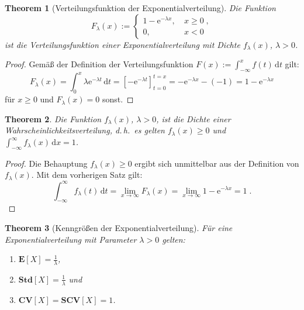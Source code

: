 \documentclass[a4paper,11pt,oneside]{article}
\newtheorem{theorem}{Theorem}
\theoremstyle{definition}
\begin{document}
\begin{theorem}[Verteilungsfunktion der Exponentialverteilung]
Die Funktion
$$
F_{\lambda}(x):=\left\{\begin{matrix}
1-\mathrm{e}^{-\lambda x},&~x\ge0\;,\\
0,&~x<0
\end{matrix}\right.
$$
ist die Verteilungsfunktion einer Exponentialverteilung mit Dichte $f_\lambda(x)$, $\lambda>0$.
\end{theorem}

\begin{proof}
Gemäß der Definition der Verteilungsfunktion $F(x):=\int_{-\infty}^x f(t)\,\mbox{d}t$ gilt:
$$
F_\lambda(x)=\int_0^x \lambda \mathrm{e}^{-\lambda t}\,\mbox{d}t=\left[-\mathrm{e}^{-\lambda t}\right]_{t=0}^{t=x}=-\mathrm{e}^{-\lambda x}-(-1)=1-\mathrm{e}^{-\lambda x}
$$
für $x\ge0$ und $F_\lambda(x)=0$ sonst.
\end{proof}

\begin{theorem}
Die Funktion $f_\lambda(x)$, $\lambda>0$, ist die Dichte einer Wahrscheinlichkeitsverteilung, d.\,h.\ es gelten $f_\lambda(x)\ge0$ und $\int_{-\infty}^\infty f_\lambda(x)\,\mbox{d}x=1$.
\end{theorem}

\begin{proof}
Die Behauptung $f_\lambda(x)\ge0$ ergibt sich unmittelbar aus der Definition von $f_\lambda(x)$. Mit dem vorherigen Satz gilt:
$$
\int_{-\infty}^\infty f_\lambda(t)\,\mbox{d}t=\lim_{x\to\infty}F_\lambda(x)=\lim_{x\to\infty}1-\mathrm{e}^{-\lambda x}=1\;.
$$
\end{proof}

\begin{theorem}[Kenngrößen der Exponentialverteilung]
Für eine Exponentialverteilung mit Parameter $\lambda>0$ gelten:
\begin{enumerate}
\item $\mathbf{E}[X]=\frac{1}{\lambda}$,
\item $\mathbf{Std}[X]=\frac{1}{\lambda}$ und
\item $\mathbf{CV}[X]=\mathbf{SCV}[X]=1$.
\end{enumerate}
\end{theorem}
\end{document}
